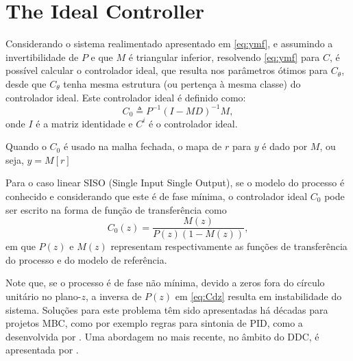 \section{The Ideal Controller}%
\label{sec:ideal_controller}

Considerando o sistema realimentado apresentado em \eqref{eq:ymf}, e assumindo a invertibilidade de $P$ e que $M$ é triangular inferior, resolvendo \eqref{eq:ymf} para $C$, é possível calcular o controlador ideal, que resulta nos parâmetros ótimos para $C_\theta$, desde que $C_\theta$ tenha mesma estrutura (ou pertença à mesma classe) do controlador ideal. Este controlador ideal é definido como:
\begin{equation}
   C_0 \triangleq P^{-1}(I-MD)^{-1}M,
\label{eq:}
\end{equation}
onde $I$ é a matriz identidade e $C^{i}$ é o controlador ideal.

Quando o $C_0$ é usado na malha fechada, o mapa de $r$ para $y$ é dado por $M$, ou seja, $y=M[r]$

Para o caso linear SISO (Single Input Single Output), se o modelo do processo é conhecido e considerando que este é de 
fase mínima, o controlador ideal $C_0$ pode ser escrito na forma de função de transferência como
\begin{equation}
   C_0(z) = \frac{M(z)}{P(z)\left(1-M(z)\right)},
   \label{eq:Cdz}
\end{equation}
em que $P(z)$ e $M(z)$ representam respectivamente as funções de transferência do processo e do modelo de referência.

Note que, se o processo é de fase não mínima, devido a zeros fora do círculo unitário no plano-$z$, a inversa de $P(z)$ em \eqref{eq:Cdz} resulta em instabilidade do sistema. Soluções para este problema têm sido apresentadas há décadas para projetos MBC, como por exemplo regras para sintonia de PID, como a desenvolvida por \cite{skogestad2003}.
Uma abordagem no mais recente, no âmbito do DDC, é apresentada por \cite{campestrini2011}.




